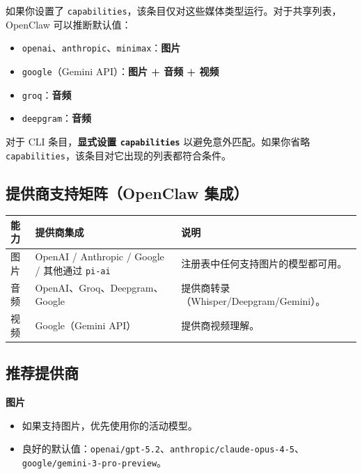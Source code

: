 如果你设置了 \texttt{capabilities}，该条目仅对这些媒体类型运行。对于共享列表，OpenClaw 可以推断默认值：

\begin{itemize}
  \item \texttt{openai}、\texttt{anthropic}、\texttt{minimax}：\textbf{图片}
  \item \texttt{google}（Gemini API）：\textbf{图片 + 音频 + 视频}
  \item \texttt{groq}：\textbf{音频}
  \item \texttt{deepgram}：\textbf{音频}
\end{itemize}


对于 CLI 条目，\textbf{显式设置 \texttt{capabilities}} 以避免意外匹配。如果你省略 \texttt{capabilities}，该条目对它出现的列表都符合条件。

\subsection{提供商支持矩阵（OpenClaw 集成）}



\begin{table}[h]
\centering
\small
\begin{tabular}{|l|l|l|}
\hline
能力 & 提供商集成 & 说明 \\
\hline
图片 & OpenAI / Anthropic / Google / 其他通过 \texttt{pi-ai} & 注册表中任何支持图片的模型都可用。 \\
\hline
音频 & OpenAI、Groq、Deepgram、Google & 提供商转录（Whisper/Deepgram/Gemini）。 \\
\hline
视频 & Google（Gemini API） & 提供商视频理解。 \\
\hline
\end{tabular}
\end{table}



\subsection{推荐提供商}


\textbf{图片}

\begin{itemize}
  \item 如果支持图片，优先使用你的活动模型。
  \item 良好的默认值：\texttt{openai/gpt-5.2}、\texttt{anthropic/claude-opus-4-5}、\texttt{google/gemini-3-pro-preview}。
\end{itemize}


